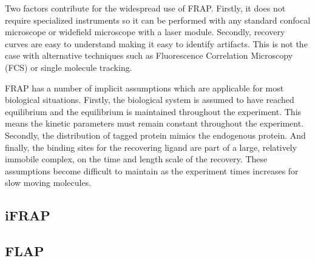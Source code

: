     Two factors contribute for the widespread use of FRAP.
    Firstly, it does not require specialized instruments
    so it can be performed with
    any standard confocal microscope or widefield microscope with a laser
    module.
    Secondly, recovery curves are easy to understand making it easy to
    identify artifacts.  This is not the case with alternative techniques
    such as Fluorescence Correlation Microscopy (FCS) or single molecule
    tracking.

    FRAP has a number of implicit assumptions which are applicable
    for most biological situations.
    Firstly, the biological system is assumed to have
    reached equilibrium and the equilibrium
    is maintained throughout the experiment.
    This means the kinetic parameters
    must remain constant throughout the experiment.
    Secondly, the distribution of tagged protein mimics the endogenous
    protein.
    And finally, the binding sites for the recovering ligand
    are part of a large, relatively immobile
    complex, on the time and length scale of the recovery.
    These assumptions become difficult to maintain as the experiment
    times increases for slow moving molecules.

  \subsection{iFRAP}


  \subsection{FLAP}

